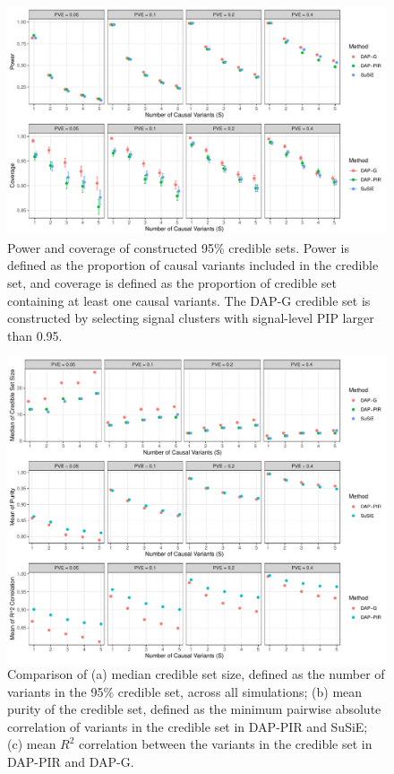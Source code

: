 \documentclass[pdflatex,sn-mathphys-num]{sn-jnl}%
\theoremstyle{thmstyleone}%
\theoremstyle{thmstyletwo}%
\theoremstyle{thmstylethree}%
\begin{document}
\begin{figure}[H]
    \centering
    \includegraphics[width=1\textwidth]{files/plot_coverage.pdf}
    \caption{Power and coverage of constructed 95\% credible sets. Power is defined as the proportion of causal variants included in the credible set, and coverage is defined as the proportion of credible set containing at least one causal variants. The DAP-G credible set is constructed by selecting signal clusters with signal-level PIP larger than 0.95.}
    \label{fig:coverage}
\end{figure}





\begin{figure}[H]
    \centering
    \includegraphics[width=1\textwidth]{files/plot_size.pdf}
    \caption{Comparison of (a) median credible set size, defined as the number of variants in the 95\% credible set, across all simulations; (b) mean purity of the credible set, defined as the minimum pairwise absolute correlation of variants in the credible set in DAP-PIR and SuSiE; (c) mean $R^2$ correlation between the variants in the credible set in DAP-PIR and DAP-G.}
    \label{fig:size}
\end{figure}
\end{document}
